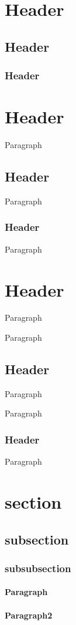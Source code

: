 \section{Header}
\subsection{Header}
\subsubsection{Header}
\hrulefill\section{Header}
Paragraph

\subsection{Header}
Paragraph

\subsubsection{Header}
Paragraph

\hrulefillParagraph

\section{Header}
Paragraph

Paragraph

\subsection{Header}
Paragraph

Paragraph

\subsubsection{Header}
Paragraph

\section{section}
\subsection{subsection}
\subsubsection{subsubsection}
\paragraph{Paragraph}
\paragraph{Paragraph2}
